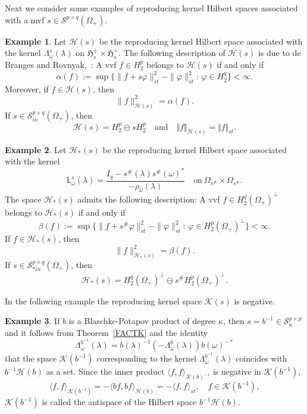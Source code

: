 \documentclass[12pt,twoside,a4paper]{amsart}
\theoremstyle{definition}
\newtheorem{example}{Example}
\numberwithin{equation}{section}
\begin{document}
Next we consider some examples of reproducing kernel Hilbert spaces
associated with a mvf  $s\in
{\mathcal S}^{p\times q}(\Omega_+)$.

\begin{example}\label{dBspace}
Let ${{\mathcal H}}(s)$ be the reproducing kernel Hilbert space associated
with the kernel ${\mathsf \Lambda}_\omega^s(\lambda)$ on
$\mathfrak{H}_s^+\times\mathfrak{H}_s^+$.
The following description of ${{\mathcal H}}(s)$ is due to de Branges and Rovnyak,~\cite{dBR}: A vvf $f\in H_2^p$ belongs to ${{\mathcal H}}(s)$ if and only if
\begin{equation}\label{dBR2}
    \alpha(f):=\sup\{ \|f+s\varphi\|_{st}^2-\|\varphi\|_{st}^2:\,\varphi\in{
    H}_2^q\}<\infty.
\end{equation}
Moreover, if $f\in {{\mathcal H}}(s)$,  then
\[
\|f\|_{{{\mathcal H}}(s)}^2=\alpha(f).
\]
If  $s\in
{\mathcal S}_{in}^{p\times q}(\Omega_+)$, then
\[
{{\mathcal H}}(s)=H_2^p\ominus sH_2^p\quad\textrm{and}\quad \Vert f\Vert_{{{\mathcal H}}(s)}=
\Vert f\Vert_{st}.
\]
\end{example}
\begin{example}\label{dBspace1}
Let ${{\mathcal H}}_*(s)$ be the reproducing kernel Hilbert space associated with the
kernel
\begin{equation}\label{KernelL}
    {\mathsf  L}_{\omega}^s(\lambda)=\frac{I_q-s^{\#} (\lambda) s^{\#} ({\omega})^*}
{-\rho_{\omega}
    (\lambda)} \quad\text{on}\ \Omega_{s^{\#}}\times \Omega_{s^{\#}}.
\end{equation}
The space ${{\mathcal H}}_*(s)$ admits the following description: A vvf $f\in
H_2^q(\Omega_+)^\perp$ belongs to ${{\mathcal H}}_*(s)$ if and only if
\begin{equation}
    \beta(f):=\sup\{ \|f+s^\#\varphi\|_{st}^2-\|\varphi\|_{st}^2:\,
\varphi\in H_2^p(\Omega_+)^\perp\}<\infty.
\end{equation}
If $f\in {{\mathcal H}}_*(s)$, then
\[
\|f\|_{{{\mathcal H}}_*(s)}^2=\beta(f).
\]
If $s\in
{\mathcal S}_{*in}^{p\times q}(\Omega_+)$, then
\[
{{\mathcal H}}_*(s)=H_2^q(\Omega_+)^\perp\ominus s^\#H_2^p(\Omega_+)^\perp.
\]
\end{example}
In the following example the reproducing kernel space ${{\mathcal K}}(s)$ is negative.
\begin{example}
If  $b$ is a Blaschke-Potapov product of degree $\kappa$, then
$s=b^{-1}\in {\mathcal S}_{\kappa}^{p\times p}$ and it follows from
Theorem~\ref{FACTK} and the identity
\[
{\mathsf
    \Lambda}_\omega^{b^{-1}}(\lambda)=b({\lambda})^{-1}({-\mathsf
    \Lambda}_\omega^{b}(\lambda))b({\omega})^{-*}
\]
that the space ${{\mathcal K}}(b^{-1})$ corresponding to the kernel ${\mathsf
    \Lambda}_\omega^{b^{-1}}(\lambda)$
coincides with $b^{-1}{{\mathcal H}}(b)$ as
a set. 
Since the inner product $\langle f,f\rangle_{{{\mathcal K}}(b)^{-1}}$ is
negative in ${{\mathcal K}}(b^{-1})$,
\[
\langle f,f\rangle_{{{\mathcal K}}(b^{-1})}=-\langle
bf,bf\rangle_{{{\mathcal H}}(b)}=-\langle f,f\rangle_{st},\quad
f\in{{{\mathcal K}}(b^{-1})},
\]
${{\mathcal K}}(b^{-1})$ is called the antispace of the Hilbert space
$b^{-1}{{\mathcal H}}(b)$.
\end{example}
\end{document}
